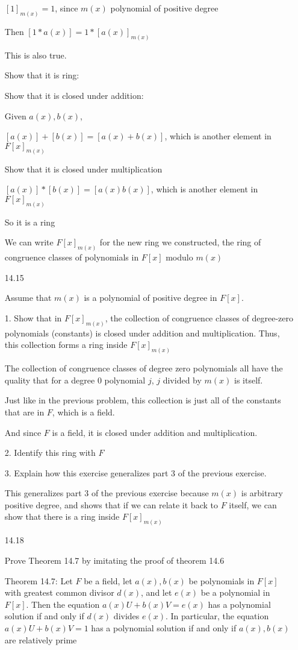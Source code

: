 \documentclass[12pt]{article}
\begin{document}
\begin{itemize}
		$[1]_{m(x)} = 1$, since $m(x)$ polynomial of positive degree

		Then $[1*a(x)] = 1 * [a(x)]_{m(x)}$

		This is also true.

		Show that it is ring:

		Show that it is closed under addition:

		Given $a(x), b(x)$,

		$[a(x)]+ [b(x)] = [a(x) + b(x)]$, which is another element in $F[x]_{m(x)}$

		Show that it is closed under multiplication

		$[a(x)]*[b(x)] = [a(x)b(x)]$, which is another element in $F[x]_{m(x)}$

		So it is a ring
	
		We can write $F[x]_{m(x)}$ for the new ring we constructed, the ring of congruence classes of polynomials in $F[x]$ modulo $m(x)$
\newpage 
\item[14.15]

	Assume that $m(x)$ is a polynomial of positive degree in $F[x]$.

	1. Show that in $F[x]_{m(x)}$, the collection of congruence classes of degree-zero polynomials (constants) is closed under addition and multiplication. Thus, this collection forms a ring inside $F[x]_{m(x)}$

	The collection of congruence classes of degree zero polynomials all have the quality that for a degree 0 polynomial $j$, $j$ divided by $m(x)$ is itself.

	Just like in the previous problem, this collection is just all of the constants that are in $F$, which is a field.

	And since $F$ is a field, it is closed under addition and multiplication.

	2. Identify this ring with $F$

	3. Explain how this exercise generalizes part 3 of the previous exercise.

	This generalizes part 3 of the previous exercise because $m(x)$ is arbitrary positive degree, and shows that if we can relate it back to $F$ itself, we can show that there is a ring inside $F[x]_{m(x)}$

\newpage 
\item[14.18]

Prove Theorem 14.7 by imitating the proof of theorem 14.6

		Theorem 14.7: Let $F$ be a field, let $a(x), b(x)$ be polynomials in $F[x]$ with greatest common divisor $d(x)$, and let $e(x)$ be a polynomial in $F[x]$. Then the equation $a(x)U + b(x)V = e(x)$ has a polynomial solution if and only if $d(x)$ divides $e(x)$. In particular, the equation $a(x)U + b(x)V = 1$ has a polynomial solution if and only if $a(x), b(x)$ are relatively prime


\end{itemize}
\end{document}
